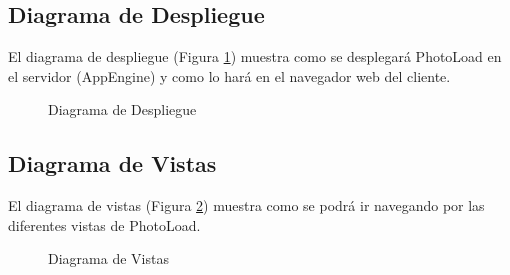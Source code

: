 \documentclass{scrartcl}
\begin{document}
\subsection{Diagrama de Despliegue}
El diagrama de despliegue (Figura \ref{fig:DiagramaDespliegue}) muestra como se desplegará PhotoLoad en el servidor (AppEngine) y como lo hará en el navegador web del cliente.

\begin{figure}[H]
	
	\centering
	\caption{Diagrama de Despliegue}
	\label{fig:DiagramaDespliegue}
	
\end{figure}
\subsection{Diagrama de Vistas}\label{cap:DiagramaVistas}
El diagrama de vistas (Figura \ref{fig:DiagramaVistas}) muestra como se podrá ir navegando por las diferentes vistas de PhotoLoad.
\begin{figure}[H]
	
	\centering
	\caption{Diagrama de Vistas}
	\label{fig:DiagramaVistas}
	
\end{figure}
\end{document}
